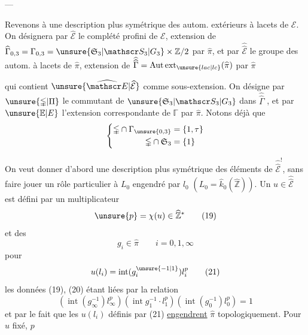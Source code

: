 \begin{center}---\end{center}
\margin{$\unsure{\rho}$}
Revenons à une description plus symétrique des autom. extérieurs à lacets de $\mathscr E$. On désignera par $\widehat{\mathscr E}$ le complété profini de $\mathscr E$, extension de $\widehat\Gamma_{0,3}=\Gamma_{0,3}=\unsure{\mathfrak S_3|\mathscr S_3|G_3}\times\mathbb Z/2$ par $\widehat\pi$, et par $\widehat{\widehat{\mathscr E}}$ le groupe des autom.  à lacets de $\widehat\pi$, extension de $\widehat{\widehat\Gamma}=\operatorname{Aut}\operatorname{ext}_{\unsure{lac|lc}}(\widehat\pi)$ par $\widehat\pi$

qui contient $\unsure{\widehat{\mathscr E}|\widehat{\mathcal E}}$ comme sous-extension. On désigne par $\unsure{\mathbb\Gamma|\Pi}$ le commutant de $\unsure{\mathfrak S_3|\mathscr S_3|G_3}$ dans $\widehat{\widehat\Gamma}$ , et par $\unsure{\mathbb E|E}$ l'extension correspondante de $\mathbb\Gamma$ par $\widehat\pi$. Notons déjà que
\[
\left\{\begin{aligned}
\mathbb\Gamma\cap\Gamma_{\unsure{0,3}}&=\{1,\tau\}\\
\mathbb\Gamma\cap\mathfrak S_3&=\{1\}
\end{aligned}\right.
\]

On veut donner d'abord une description plus symétrique des éléments de $\widehat{\widehat{\mathscr E}}^{!}$, sans faire jouer un rôle particulier à $L_0$ engendré par $l_0$ $(L_0=\widehat k_0(\widehat{\mathbb Z}))$. Un $u\in\widehat{\widehat{\mathscr E}}$ est  défini par un multiplicateur
\[
\unsure{p}=\chi(u)\in\widehat{\mathbb Z}^{*}\tag*{(19)}
\]
et des
\[
g_i\in\widehat\pi\qquad i=0,1,\infty\tag*{(20)}
\]
pour
\[
u(l_i)=\operatorname{int}(g_i^{\unsure{-1|1}})l_i^p\tag*{(21)}
\]
les données (19), (20) étant liées par la relation
\[
(\operatorname{int}(g_\infty^{-1})l_\infty^p)(\operatorname{int}g_1^{-1}\cdot l_1^p)(\operatorname{int}(g_0^{-1})l_0^p)=1\tag*{(22)}
\]
et par le fait que les $u(l_i)$ définis par (21) \uline{engendrent} $\widehat\pi$ topologiquement. Pour $u$ fixé, $p$

